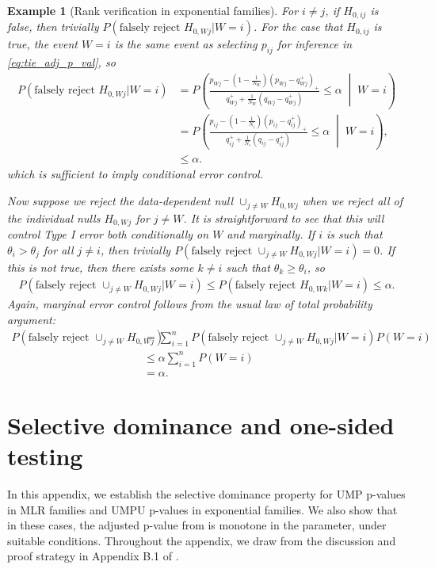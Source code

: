 \documentclass{article}
\newtheorem{example}{Example}
\begin{document}
\begin{appendix}
\begin{example}[Rank verification in exponential families]
    For $i \neq j$, if $H_{0, ij}$ is false, then trivially $P(\text{falsely reject } H_{0, Wj}| W= i)$. For the case that $H_{0, ij}$ is true, the event $W=i$ is the same event as selecting $p_{ij}$ for inference in \eqref{eq:tie_adj_p_val}, so 
    \begin{align*}
        P(\text{falsely reject } H_{0, Wj}| W= i) &= P\left(\frac{p_{Wj} - (1-\frac{1}{N_W})(p_{Wj} - q_{Wj}^+)_+ }{q_{Wj}^+ + \frac{1}{N_W}(q_{Wj} - q^+_{Wj})} \leq \alpha \;\middle|\; W= i\right) \\
        &= P\left(\frac{p_{ij} - (1-\frac{1}{N_i})(p_{ij} - q_{ij}^+)_+ }{q_{ij}^+ + \frac{1}{N_i}(q_{ij} - q^+_{ij})} \leq \alpha \;\middle|\; W = i\right), \\
        &\leq \alpha. 
    \end{align*}
    which is sufficient to imply conditional error control. 

    Now suppose we reject the data-dependent null $\cup_{j \neq W} H_{0, Wj}$ when we reject all of the individual nulls $H_{0, Wj}$ for $j \neq W$. It is straightforward to see that this will control Type I error both conditionally on $W$ and marginally. If $i$ is such that $\theta_i > \theta_j$ for all $j \neq i$, then trivially $ P(\text{falsely reject } \cup_{j \neq W} H_{0, Wj}| W= i) = 0 $. If this is not true, then there exists some $k \neq i$ such that $\theta_k \geq \theta_i$, so 
    \begin{align*}
        P(\text{falsely reject } \cup_{j \neq W} H_{0, Wj}| W= i) \leq P(\text{falsely reject } H_{0, Wk}| W= i) \leq \alpha.
    \end{align*} 
    Again, marginal error control follows from the usual law of total probability argument:
    \begin{align*}
        P(\text{falsely reject } \cup_{j \neq W} H_{0, Wj}) &= \sum_{i=1}^n P(\text{falsely reject } \cup_{j \neq W} H_{0, Wj} |W = i) P(W= i)\\
        &\leq \alpha \sum_{i=1}^n P(W=i)\\
        &=\alpha.
    \end{align*}
\end{example}

\section{Selective dominance and one-sided testing}
\label{sec:one_sided_appdx}

In this appendix, we establish the selective dominance property for UMP p-values in MLR families and UMPU p-values in exponential families. We also show that in these cases, the adjusted p-value from  is monotone in the parameter, under suitable conditions. Throughout the appendix, we draw from the discussion and proof strategy in Appendix B.1 of \cite{Lei}.


\end{appendix}
\end{document}
